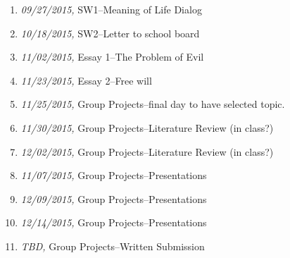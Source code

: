 \documentclass[11pt,article,oneside]{memoir}
\begin{document}
\begin{enumerate}
\item \textit{09/27/2015,} SW1--Meaning of Life Dialog
\item \textit{10/18/2015,} SW2--Letter to school board
\item \textit{11/02/2015,} Essay 1--The Problem of Evil
\item \textit{11/23/2015,} Essay 2--Free will
\item \textit{11/25/2015,} Group Projects--final day to have selected topic.
\item \textit{11/30/2015,} Group Projects--Literature Review (in class?)
\item \textit{12/02/2015,} Group Projects--Literature Review (in class?) 
\item \textit{11/07/2015,} Group Projects--Presentations
\item \textit{12/09/2015,} Group Projects--Presentations
\item \textit{12/14/2015,} Group Projects--Presentations
\item \textit{TBD,} Group Projects--Written Submission
\end{enumerate}




\end{document}
